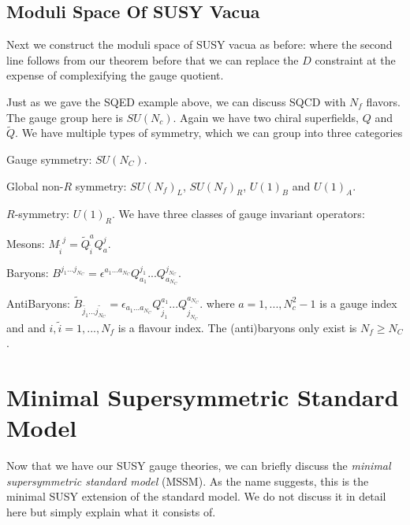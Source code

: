 \subsection{Moduli Space Of SUSY Vacua}

Next we construct the moduli space of SUSY vacua as before:
\noindent where the second line follows from our theorem before that we can replace the $D$ constraint at the expense of complexifying the gauge quotient. 

\bex 
    Just as we gave the SQED example above, we can discuss SQCD with $N_f$ flavors. The gauge group here is $SU(N_c)$. Again we have two chiral superfields, $Q$ and $\widetilde{Q}$. We have multiple types of symmetry, which we can group into three categories 
    \ben[label=(\roman*)]
        \item Gauge symmetry: $SU(N_C)$.
        \item Global non-$R$ symmetry: $SU(N_f)_L$, $SU(N_f)_R$, $U(1)_B$ and $U(1)_A$.
        \item $R$-symmetry: $U(1)_R$.
    \een
    We have three classes of gauge invariant operators:
    \ben 
        \item Mesons: ${M_{\widetilde{i}}}^j = \widetilde{Q}^a_{\widetilde{i}} Q^j_a$. 
        \item Baryons: $B^{j_1...j_{N_C}} = \epsilon^{a_1...a_{N_C}} Q^{j_1}_{a_1} ... Q^{j_{N_C}}_{a_{N_C}}$. 
        \item AntiBaryons: $\widetilde{B}_{\widetilde{j_1}...\widetilde{j_{N_C}}} = \epsilon_{a_1...a_{N_C}} Q_{\widetilde{j_1}}^{a_1} ... Q_{\widetilde{j_{N_C}}}^{a_{N_C}}$.
    \een 
    where $a = 1, ..., N_c^2-1$ is a gauge index and and $i,\widetilde{i}=1,...,N_f$ is a flavour index. The (anti)baryons only exist is $N_f\geq N_C$. 
\eex 

\section{Minimal Supersymmetric Standard Model}

Now that we have our SUSY gauge theories, we can briefly discuss the \textit{minimal supersymmetric standard model} (MSSM). As the name suggests, this is the minimal SUSY extension of the standard model. We do not discuss it in detail here but simply explain what it consists of. 

